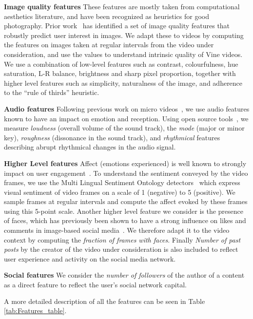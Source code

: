 \noindent\textbf{Image quality features} These features are mostly taken from computational aesthetics literature, and have been recognized as heuristics for good photography. Prior work~\cite{predictingPintrest} has identified a set of image quality features that robustly predict user interest in images. We  adapt these to videos by computing  the features on images taken at regular intervals from the video under consideration, and use the values to understand intrinsic quality of Vine videos. We use a combination of low-level features such as contrast, colourfulness, hue saturation, L-R balance, brightness and sharp pixel proportion, together with higher level features such as simplicity, naturalness of the image, and adherence to the  ``rule of thirds'' heuristic. 

\noindent\textbf{Audio features}	
Following previous work on micro videos~\cite{redi20146}, we use audio features known to have an impact on emotion and reception. Using open source tools~\cite{lartillot2007matlab,laurier2009exploring}, we measure \emph{loudness} (overall volume of the sound track), the \emph{mode} (major or minor key), \emph{roughness} (dissonance in the sound track), and \emph{rhythmical} features describing abrupt rhythmical changes in the audio signal. 

\noindent\textbf{Higher Level features} Affect (emotions experienced) is well known to strongly impact on user engagement~\cite{o2008user,leung2009user}. To understand the sentiment conveyed by the video frames, we use the Multi Lingual Sentiment Ontology detectors~\cite{jou2015visual} which express visual sentiment of video frames on a scale of 1 (negative) to 5 (positive). We sample frames at regular intervals and compute the affect evoked by these frames using this 5-point scale. Another higher level feature we consider is the presence of faces, which has previously been shown to have a strong influence on  likes and comments in image-based social media~\cite{bakhshi2014faces}. We therefore adapt it to the video context by computing the \emph{fraction of frames with faces}. Finally \emph{Number of past posts} by the creator of the video under consideration is also included to reflect user experience and activity on the social media network.

\noindent\textbf{Social  features} We consider the \emph{number of followers} of  the author of a content as a direct feature to reflect the user's social network capital. 

A more detailed description of all the features can be seen in  Table \ref{tab:Features_table}.

